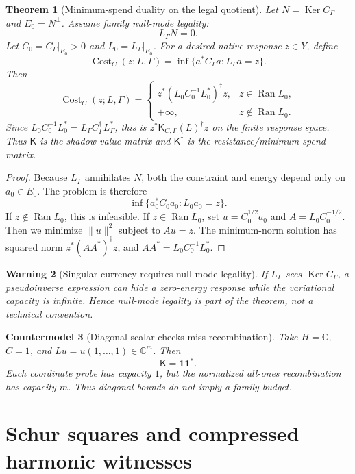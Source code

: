 \documentclass[11pt]{article}
\newtheorem{theorem}{Theorem}[section]
\newtheorem{warning}[theorem]{Warning}
\newtheorem{countermodel}[theorem]{Countermodel}
\DeclareMathOperator{\range}{Ran}
\DeclareMathOperator{\kernel}{Ker}
\DeclareMathOperator{\Cost}{Cost}
\newcommand{\K}{\mathsf K}
\begin{document}
\begin{theorem}[Minimum-spend duality on the legal quotient]
Let \(N=\kernel C_\Gamma\) and \(E_0=N^\perp\).  Assume family null-mode legality:
\[
  L_\Gamma N=0.
\]
Let \(C_0=C_\Gamma|_{E_0}>0\) and \(L_0=L_\Gamma|_{E_0}\).  For a desired native response \(z\in Y\), define
\[
  \Cost_C(z;L,\Gamma)=\inf\{a^*C_\Gamma a:L_\Gamma a=z\}.
\]
Then
\[
  \Cost_C(z;L,\Gamma)=
  \begin{cases}
    z^*(L_0C_0^{-1}L_0^*)^\dagger z, & z\in\range L_0,\\
    +\infty, & z\notin\range L_0.
  \end{cases}
\]
Since \(L_0C_0^{-1}L_0^*=L_\Gamma C_\Gamma^\dagger L_\Gamma^*\), this is \(z^*\K_{C,\Gamma}(L)^\dagger z\) on the finite response space.  Thus \(\K\) is the shadow-value matrix and \(\K^\dagger\) is the resistance/minimum-spend matrix.
\end{theorem}

\begin{proof}
Because \(L_\Gamma\) annihilates \(N\), both the constraint and energy depend only on \(a_0\in E_0\).  The problem is therefore
\[
  \inf\{a_0^*C_0a_0:L_0a_0=z\}.
\]
If \(z\notin\range L_0\), this is infeasible.  If \(z\in\range L_0\), set \(u=C_0^{1/2}a_0\) and \(A=L_0C_0^{-1/2}\).  Then we minimize \(\|u\|^2\) subject to \(Au=z\).  The minimum-norm solution has squared norm \(z^*(AA^*)^\dagger z\), and \(AA^*=L_0C_0^{-1}L_0^*\).
\end{proof}

\begin{warning}[Singular currency requires null-mode legality]
If \(L_\Gamma\) sees \(\kernel C_\Gamma\), a pseudoinverse expression can hide a zero-energy response while the variational capacity is infinite.  Hence null-mode legality is part of the theorem, not a technical convention.
\end{warning}

\begin{countermodel}[Diagonal scalar checks miss recombination]
Take \(H=\mathbb C\), \(C=1\), and \(Lu=u(1,\dots,1)\in\mathbb C^m\).  Then
\[
  \K=\mathbf 1\mathbf 1^*.
\]
Each coordinate probe has capacity \(1\), but the normalized all-ones recombination has capacity \(m\).  Thus diagonal bounds do not imply a family budget.
\end{countermodel}

\section{Schur squares and compressed harmonic witnesses}
\end{document}
